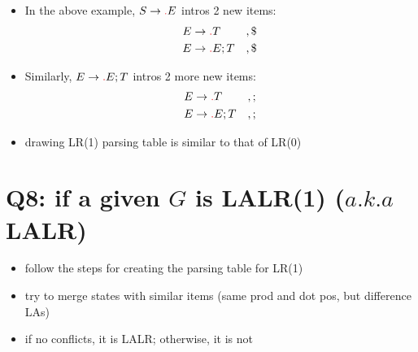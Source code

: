 \documentclass[10pt,a4paper,landscape]{article}
\begin{document}
\begin{multicols*}{3}
\begin{itemize}
\item In the above example, $S\to \lrd E$ intros 2 new items:
  \begin{align*}
    E&\to\lrd T   & &,\$\\
    E&\to\lrd E;T & &,\$
  \end{align*}
\item Similarly, $E\to \lrd E;T$ intros 2 more new items:
  \begin{align*}
    E&\to\lrd T    &  &,;\\
    E&\to\lrd E;T  &  &,;
  \end{align*}
\item drawing LR(1) parsing table is similar to that of LR(0)
\end{itemize}
\section*{Q8: if a given $G$ is LALR(1) ($a.k.a$ LALR)}
\begin{itemize}
\item follow the steps for creating the parsing table for LR(1)
\item try to merge states with similar items (same prod and dot pos, but difference LAs)
\item if no conflicts, it is LALR; otherwise, it is not
\end{itemize}
\end{multicols*}
\end{document}
